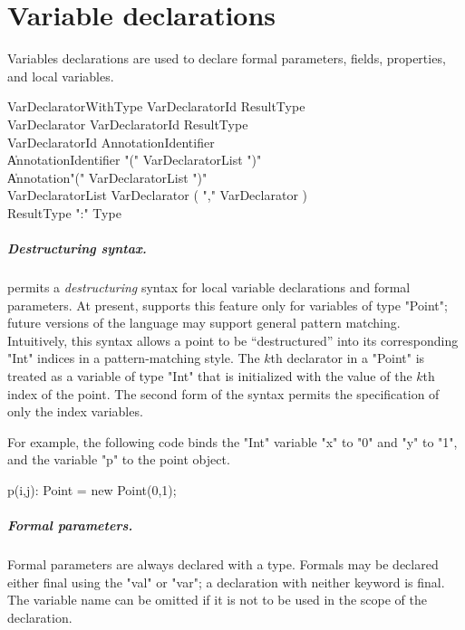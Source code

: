 \chapter{Variable declarations}
\label{exploded-syntax}
\label{VariableDeclarations}

Variables declarations are used to declare formal parameters,
fields, properties, and local variables.

\begin{grammar}
VarDeclaratorWithType \: VarDeclaratorId ResultType \\
VarDeclarator \: VarDeclaratorId ResultType\opt \\
VarDeclaratorId \: Annotation\star Identifier \\
              \| Annotation\star Identifier \xcd"(" VarDeclaratorList \xcd")" \\
              \| Annotation\star \xcd"(" VarDeclaratorList \xcd")" \\
VarDeclaratorList \: VarDeclarator ( \xcd"," VarDeclarator )\star \\
ResultType \: \xcd":" Type \\
\end{grammar}


\paragraph{Destructuring syntax.}
\Xten{} permits a \emph{destructuring} syntax for local variable
declarations and formal parameters.
At present, \XtenCurrVer{} supports this feature only for
variables of
type \xcd"Point"; future versions of the language may support 
general pattern matching.
Intuitively, this syntax allows a
point to be ``destructured'' into its corresponding \xcd"Int" 
indices in a pattern-matching style.
The $k$th declarator in a \xcd"Point"
is treated as a variable of type \xcd"Int"
that is initialized with the value of the $k$th index of the point. 
The second form of the syntax permits the specification of only
the index variables.

For example, the following code binds the \xcd"Int" variable \xcd"x" to
\xcd"0" and \xcd"y" to \xcd"1", and the variable \xcd"p" to the
point object.
\begin{xten}
p(i,j): Point = new Point(0,1);
\end{xten}

\paragraph{Formal parameters.}
Formal parameters are always declared with a type.
Formals may be declared either
final using the \xcd"val" or \xcd"var"; a declaration with
neither keyword is final.
The
variable name can be omitted if it is not to be used in the
scope of the declaration.

